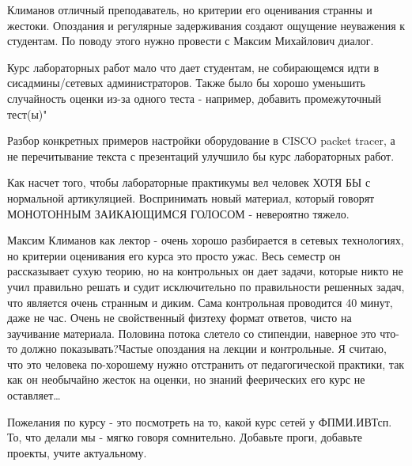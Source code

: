         \begin{commentbox}
			Климанов отличный преподаватель, но критерии его оценивания странны и жестоки. Опоздания и регулярные задерживания создают ощущение неуважения к студентам. По поводу этого нужно провести с Максим Михайлович диалог.

            Курс лабораторных работ мало что дает студентам, не собирающемся идти в сисадмины/сетевых администраторов. Также было бы хорошо уменьшить случайность оценки из-за одного теста - например, добавить промежуточный тест(ы)"
		\end{commentbox}

        \begin{commentbox}
			Разбор конкретных примеров настройки оборудование в CISCO packet tracer, а не перечитывание текста с презентаций улучшило бы курс лабораторных работ.
		\end{commentbox}

        \begin{commentbox}
			Как насчет того, чтобы лабораторные практикумы вел человек ХОТЯ БЫ с нормальной артикуляцией. Воспринимать новый материал, который говорят МОНОТОННЫМ ЗАИКАЮЩИМСЯ ГОЛОСОМ - невероятно тяжело.
		\end{commentbox}

        \begin{commentbox}
			Максим Климанов как лектор - очень хорошо разбирается в сетевых технологиях, но критерии оценивания его курса это просто ужас. Весь семестр он рассказывает сухую теорию, но на контрольных он дает задачи, которые никто не учил правильно решать и судит исключительно по правильности решенных задач, что является очень странным и диким. Сама контрольная проводится 40 минут, даже не час. Очень не свойственный физтеху формат ответов, чисто на заучивание материала. Половина потока слетело со стипендии, наверное это что-то должно показывать?Частые опоздания на лекции и контрольные. Я считаю, что это человека по-хорошему нужно отстранить от педагогической практики, так как он необычайно жесток на оценки, но знаний феерических его курс не оставляет…
		\end{commentbox}

        \begin{commentbox}
			Пожелания по курсу - это посмотреть на то, какой курс сетей у ФПМИ.ИВТсп. То, что делали мы - мягко говоря сомнительно. Добавьте проги, добавьте проекты, учите актуальному. 
		\end{commentbox}

